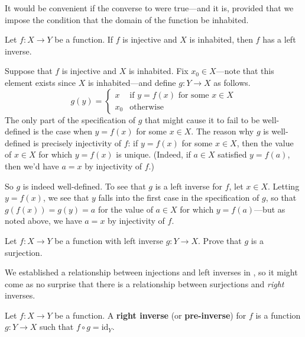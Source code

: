 It would be convenient if the converse to  were true---and it is, provided that we impose the condition that the domain of the function be inhabited.

\begin{proposition}
\label{propIfInjectiveThenHasLeftInverse}
Let $f : X \to Y$ be a function. If $f$ is injective and $X$ is inhabited, then $f$ has a left inverse.
\end{proposition}

\begin{cproof}
Suppose that $f$ is injective and $X$ is inhabited. Fix $x_0 \in X$---note that this element exists since $X$ is inhabited---and define $g : Y \to X$ as follows.
\[ g(y) = \begin{cases} x & \text{if } y=f(x) \text{ for some } x \in X \\ x_0 & \text{otherwise} \end{cases} \]
The only part of the specification of $g$ that might cause it to fail to be well-defined is the case when $y=f(x)$ for some $x \in X$. The reason why $g$ is well-defined is precisely injectivity of $f$: if $y=f(x)$ for some $x \in X$, then the value of $x \in X$ for which $y = f(x)$ is unique. (Indeed, if $a \in X$ satisfied $y=f(a)$, then we'd have $a=x$ by injectivity of $f$.)

So $g$ is indeed well-defined. To see that $g$ is a left inverse for $f$, let $x \in X$. Letting $y = f(x)$, we see that $y$ falls into the first case in the specification of $g$, so that $g(f(x)) = g(y) = a$ for the value of $a \in X$ for which $y = f(a)$---but as noted above, we have $a=x$ by injectivity of $f$.
\end{cproof}

\begin{exercise}
Let $f : X \to Y$ be a function with left inverse $g : Y \to X$. Prove that $g$ is a surjection.
\end{exercise}

We established a relationship between injections and left inverses in , so it might come as no surprise that there is a relationship between surjections and \textit{right} inverses.

\begin{definition}
\label{defRightInverse}
Let $f : X \to Y$ be a function. A \textbf{right inverse} (or \textbf{pre-inverse}) for $f$ is a function $g : Y \to X$ such that $f \circ g = \mathrm{id}_Y$.
\end{definition}


